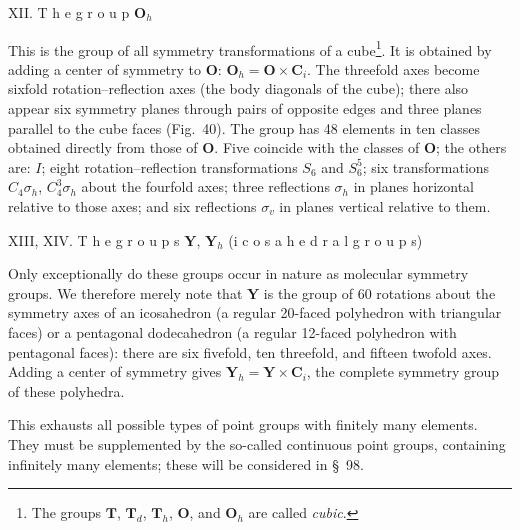 \medskip
\noindent XII. T h e  g r o u p $\boldsymbol{O}_h$

This is the group of all symmetry transformations of a cube\footnote{The groups $\boldsymbol{T}$, $\boldsymbol{T}_d$, $\boldsymbol{T}_h$, $\boldsymbol{O}$, and $\boldsymbol{O}_h$ are called \emph{cubic}.}. It is obtained by adding a center of symmetry to $\boldsymbol{O}$: $\boldsymbol{O}_h=\boldsymbol{O}\times\boldsymbol{C}_i$. The threefold axes become sixfold rotation--reflection axes (the body diagonals of the cube); there also appear six symmetry planes through pairs of opposite edges and three planes parallel to the cube faces (Fig.~40). The group has 48 elements in ten classes obtained directly from those of $\boldsymbol{O}$. Five coincide with the classes of $\boldsymbol{O}$; the others are: $I$; eight rotation--reflection transformations $S_6$ and $S_6^5$; six transformations $C_4\sigma_h$, $C_4^3\sigma_h$ about the fourfold axes; three reflections $\sigma_h$ in planes horizontal relative to those axes; and six reflections $\sigma_v$ in planes vertical relative to them.

\medskip
\noindent XIII, XIV. T h e  g r o u p s $\boldsymbol{Y}$, $\boldsymbol{Y}_h$ (i c o s a h e d r a l  g r o u p s)

Only exceptionally do these groups occur in nature as molecular symmetry groups. We therefore merely note that $\boldsymbol{Y}$ is the group of 60 rotations about the symmetry axes of an icosahedron (a regular 20-faced polyhedron with triangular faces) or a pentagonal dodecahedron (a regular 12-faced polyhedron with pentagonal faces): there are six fivefold, ten threefold, and fifteen twofold axes. Adding a center of symmetry gives $\boldsymbol{Y}_h=\boldsymbol{Y}\times\boldsymbol{C}_i$, the complete symmetry group of these polyhedra.

This exhausts all possible types of point groups with finitely many elements. They must be supplemented by the so-called continuous point groups, containing infinitely many elements; these will be considered in \S~98.
